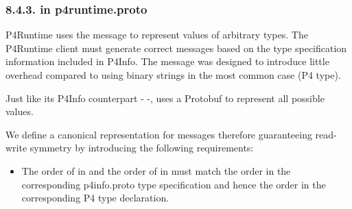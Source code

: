 \documentclass[11pt]{article}
\begin{document}
{%
\subsubsection{8.4.3.\hspace*{0.5em} in p4runtime.proto}\label{sec-p4data-in-p4runtime-proto}%

\noindent{}P4Runtime uses the  message to represent values of arbitrary types. The
P4Runtime client must generate correct  messages based on the type
specification information included in P4Info. The  message was designed
to introduce little overhead compared to using binary strings in the most common
case (P4  type).%

Just like its P4Info counterpart -  -,  uses a Protobuf
 to represent all possible values.%

We define a canonical representation for  messages \textemdash{} therefore
guaranteeing read-write symmetry \textemdash{} by introducing the following requirements:%

\begin{itemize}%

\item{}
The order of  in  and the order of  in
 must match the order in the corresponding p4info.proto type
specification and hence the order in the corresponding P4 type
declaration.%


\end{itemize}}
\end{document}
